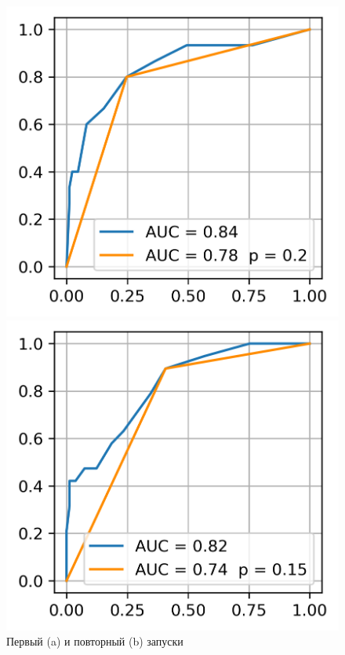 \begin{figure}[!htb]
	\centering
	\begin{minipage}{0.32\textwidth}
		\includegraphics[width=\linewidth]{pictures/Первый запуск}
	\end{minipage}
	\hspace{0.1\textwidth}
	\begin{minipage}{0.32\textwidth}
		\includegraphics[width=\linewidth]{pictures/Повторный запуск}
		
	\end{minipage}
	\caption{Первый (a) и повторный (b) запуски}
\end{figure}
